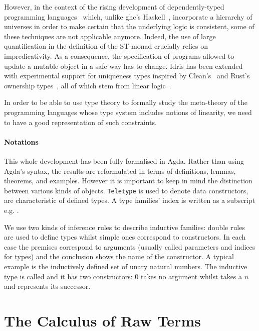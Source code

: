 \documentclass[a4paper,UKenglish]{lipics-v2016}
\begin{document}
However, in the context of the rising development of dependently-typed
programming languages~\cite{Brady2013idris, norell2009dependently} which,
unlike ghc's Haskell~\cite{weirich2013towards}, incorporate a hierarchy
of universes in order to make certain that the underlying logic is consistent,
some of these techniques are not applicable anymore. Indeed, the use of
large quantification in the definition of the ST-monad crucially relies
on impredicativity. As a consequence, the specification of programs
allowed to update a mutable object in a safe way has to change.
Idris has been extended with experimental support for uniqueness types
inspired by Clean's~\cite{achten1993high} and Rust's ownership types~\cite{manual:rust},
all of which stem from linear logic~\cite{girard1987linear}.

In order to be able to use type theory to formally study the meta-theory
of the programming languages whose type system includes notions of linearity,
we need to have a good representation of such constraints.

\paragraph*{Notations} This whole development has been fully formalised
in Agda. Rather than using Agda's syntax, the results are reformulated
in terms of definitions, lemmas, theorems, and examples. However it is
important to keep in mind the distinction between various kinds of objects.
\texttt{Teletype} is used to denote data constructors,  are characteristic of defined types. A type families' index is
written as a subscript e.g. .

We use two kinds of inference rules to describe inductive families: double
rules are used to define types whilst simple ones correspond to constructors.
In each case the premises correspond to arguments (usually called parameters
and indices for types) and the conclusion shows the name of the constructor.
A typical example is the inductively defined set of unary natural numbers.
The inductive type is called \Nat{} and it has two constructors: $0$ takes
no argument whilst \natsucc{\cdot} takes a \Nat{} $n$ and represents its successor.

\section{The Calculus of Raw Terms}
\end{document}
